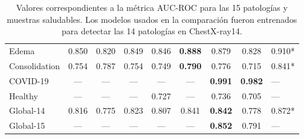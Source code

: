 \begin{table}[tb]
\begin{tabular}{|l||c|c|c|c|c|c|c|l|}
        Edema	        &	0.850	&	0.820	&	0.849	&	0.846	&\bf{0.888}	&	0.879	& 0.828 &	0.910*	\\
        Consolidation	&	0.754	&	0.787	&	0.754	&	0.749	&\bf{0.790}	&	0.776	& 0.715 &	0.841*	\\
        \hline
        COVID-19	    &	---	    &	---	    &	---	    &	---	    &	---	    &\bf{0.991}	& \bf 0.982 &	---	    \\
        Healthy	        &	---	    &	---	    &	---	    &	0.727	&	---	    &	0.736	& 0.705 &	---	    \\
        \hline\hline
        Global-14	    &	0.816	&	0.775	&	0.823	&	0.807	&	0.841	&\bf{0.842}	& 0.778 &	0.872*	\\
        Global-15	    &	---	    &	---	    &	---	    &	---	    &	---	    &\bf{0.852}	& 0.791 &	---	    \\
        \hline
    \end{tabular}
    \caption{Valores correspondientes a la métrica AUC-ROC para las 15 patologías y muestras saludables.
             Los modelos usados en la comparación fueron entrenados para detectar las 14 patologías
             en ChestX-ray14.}
    \label{table_roc_auc}
\end{table}


